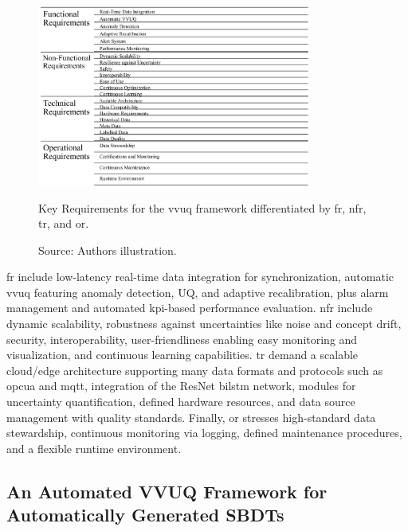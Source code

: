 \begin{figure}[htbp]
    \centering
    \includegraphics[width=0.8\textwidth]{figures/req.png}
    \caption[Key Requirements for VVUQ]{Key Requirements for the \gls{vvuq} framework differentiated by \gls{fr}, \gls{nfr}, \gls{tr}, and \gls{or}. }
    \caption*{Source: Authors illustration.}
    \label{fig:requirements}
\end{figure}

\gls{fr} include low-latency real-time data integration for synchronization, automatic \gls{vvuq} featuring anomaly detection, UQ, and adaptive recalibration, plus alarm management and automated \gls{kpi}-based performance evaluation. \gls{nfr} include dynamic scalability, robustness against uncertainties like noise and concept drift, security, interoperability, user-friendliness enabling easy monitoring and visualization, and continuous learning capabilities. \gls{tr} demand a scalable cloud/edge architecture supporting many data formats and protocols such as \gls{opcua} and \gls{mqtt}, integration of the ResNet \gls{bilstm} network, modules for uncertainty quantification, defined hardware resources, and data source management with quality standards. Finally, \gls{or} stresses high-standard data stewardship, continuous monitoring via logging, defined maintenance procedures, and a flexible runtime environment.

\subsection{An Automated VVUQ Framework for Automatically Generated SBDTs}
\label{sec:framework}

